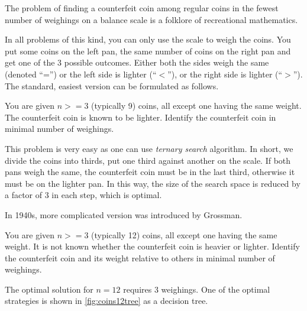 The problem of finding a counterfeit coin among regular coins in the fewest
  number of weighings on a balance scale is a folklore of
  recreational mathematics.

In all problems of this kind, you can only use the scale to weigh the coins.
You put some coins on the left pan, the same number of coins on the right pan
  and get one of the 3 possible outcomes.
Either both the sides weigh the same (denoted ``='')
  or the left side is lighter (``$<$''),
  or the right side is lighter (``$>$'').
The standard, easiest version can be formulated as follows.

\begin{problem} \label{pr:coins9}
You are given $n >= 3$ (typically 9) coins, all except one having the same weight.
The counterfeit coin is known to be lighter.
Identify the counterfeit coin in minimal number of weighings.
\end{problem}

This problem is very easy as one can use \emph{ternary search} algorithm.
In short, we divide the coins into thirds, put one third against another
  on the scale.
If both pans weigh the same, the counterfeit coin must be in the last third,
  otherwise it must be on the lighter pan.
In this way, the size of the search space is reduced
  by a factor of 3 in each step, which is optimal.

In 1940s, more complicated version was introduced by Grossman\cite{coins-grossman1945}.

\begin{problem} \label{pr:coins12}
You are given $n >= 3$ (typically 12) coins, all except one having the same weight.
It is not known whether the counterfeit coin is heavier or lighter.
Identify the counterfeit coin and its weight relative to others
  in minimal number of weighings.
\end{problem}

The optimal solution for $n=12$ requires 3 weighings.
One of the optimal
  strategies is shown in \autoref{fig:coins12tree} as a decision tree.

